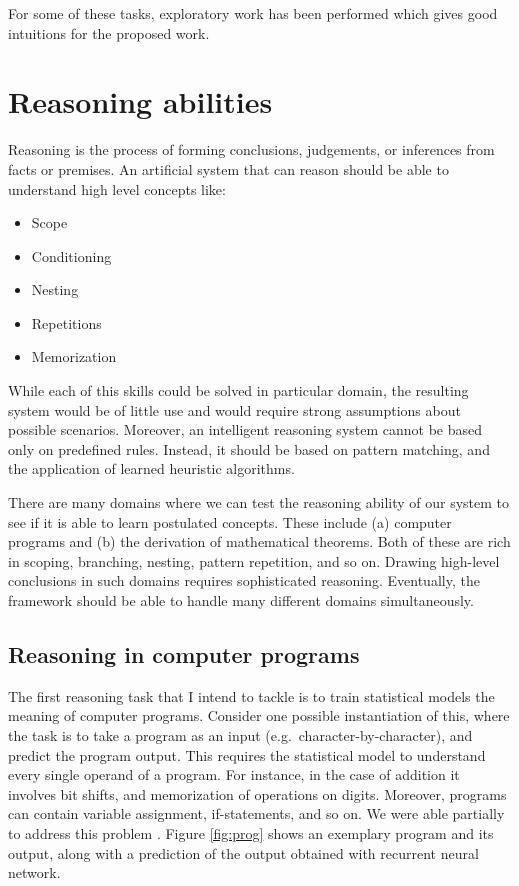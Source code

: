 \documentclass{article}
\begin{document}
For some of these tasks, exploratory work has been performed which
gives good intuitions for the proposed work. 

\section{Reasoning abilities}

Reasoning is the process of forming conclusions, judgements, or
inferences from facts or premises. An artificial system that can
reason should be able to understand high level concepts like: 
\begin{itemize}
 \item Scope
 \item Conditioning
 \item Nesting
 \item Repetitions
 \item Memorization 
 \end{itemize}
While each of this skills could be solved in particular domain, the
resulting system would be of little use and would require
strong assumptions about possible scenarios. Moreover, an intelligent
reasoning system cannot be based only on predefined rules. Instead, it
should be based on pattern matching, and the application of learned heuristic algorithms. 

There are many domains where we can test the reasoning ability of our
system to see if it is able to learn postulated concepts. These
include (a) computer programs and (b) the derivation of mathematical
theorems. Both of these are rich in scoping, branching, nesting,
pattern repetition, and so on. Drawing high-level conclusions in such
domains requires sophisticated reasoning. Eventually, the framework
should be able to handle many different domains simultaneously.

\subsection{Reasoning in computer programs}
The first reasoning task that I intend to tackle is to train
statistical models the meaning of computer programs.
Consider one possible instantiation of this, where the task is to take
a program as an input (e.g.~character-by-character), and predict the
program output. This requires the statistical model to understand
every single operand of a program. For instance, in the case of
addition it involves bit shifts, and memorization of operations on
digits. Moreover, programs can contain variable assignment, if-statements, and so on.
We were able partially to address this problem \cite{zaremba2014execute}.
Figure \ref{fig:prog} shows an exemplary program and its output, along
with a prediction of the output obtained with recurrent neural network.
\end{document}
